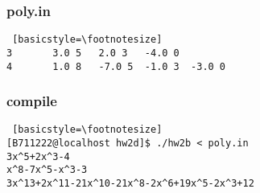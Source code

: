 \documentclass[twoside,twocolumn]{article}
\begin{document}
\subsubsection{poly.in}
\begin{lstlisting} [basicstyle=\footnotesize]
3       3.0 5   2.0 3   -4.0 0
4       1.0 8   -7.0 5  -1.0 3  -3.0 0
\end{lstlisting}

\subsubsection{compile}
\begin{lstlisting} [basicstyle=\footnotesize]
[B711222@localhost hw2d]$ ./hw2b < poly.in
3x^5+2x^3-4
x^8-7x^5-x^3-3
3x^13+2x^11-21x^10-21x^8-2x^6+19x^5-2x^3+12
\end{lstlisting}


\end{document}
